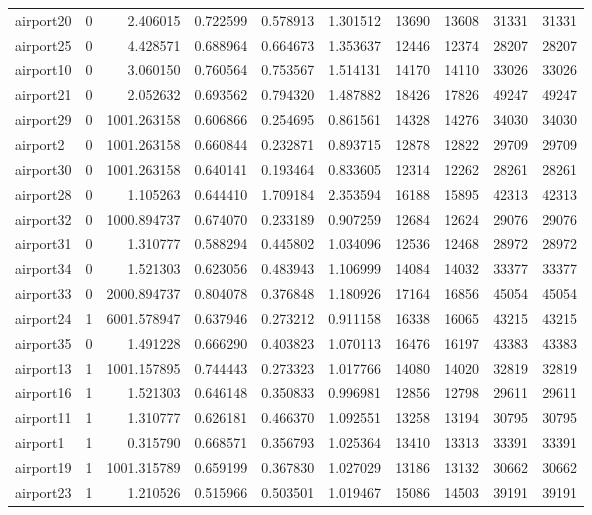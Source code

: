 \begin{longtable}{|l|r|r|r|r|r|r|r|r|r|}
airport20 & 0 & 2.406015 & 0.722599 & 0.578913 & 1.301512 & 13690 & 13608 & 31331 & 31331 \\
airport25 & 0 & 4.428571 & 0.688964 & 0.664673 & 1.353637 & 12446 & 12374 & 28207 & 28207 \\
airport10 & 0 & 3.060150 & 0.760564 & 0.753567 & 1.514131 & 14170 & 14110 & 33026 & 33026 \\
airport21 & 0 & 2.052632 & 0.693562 & 0.794320 & 1.487882 & 18426 & 17826 & 49247 & 49247 \\
airport29 & 0 & 1001.263158 & 0.606866 & 0.254695 & 0.861561 & 14328 & 14276 & 34030 & 34030 \\
airport2 & 0 & 1001.263158 & 0.660844 & 0.232871 & 0.893715 & 12878 & 12822 & 29709 & 29709 \\
airport30 & 0 & 1001.263158 & 0.640141 & 0.193464 & 0.833605 & 12314 & 12262 & 28261 & 28261 \\
airport28 & 0 & 1.105263 & 0.644410 & 1.709184 & 2.353594 & 16188 & 15895 & 42313 & 42313 \\
airport32 & 0 & 1000.894737 & 0.674070 & 0.233189 & 0.907259 & 12684 & 12624 & 29076 & 29076 \\
airport31 & 0 & 1.310777 & 0.588294 & 0.445802 & 1.034096 & 12536 & 12468 & 28972 & 28972 \\
airport34 & 0 & 1.521303 & 0.623056 & 0.483943 & 1.106999 & 14084 & 14032 & 33377 & 33377 \\
airport33 & 0 & 2000.894737 & 0.804078 & 0.376848 & 1.180926 & 17164 & 16856 & 45054 & 45054 \\
airport24 & 1 & 6001.578947 & 0.637946 & 0.273212 & 0.911158 & 16338 & 16065 & 43215 & 43215 \\
airport35 & 0 & 1.491228 & 0.666290 & 0.403823 & 1.070113 & 16476 & 16197 & 43383 & 43383 \\
airport13 & 1 & 1001.157895 & 0.744443 & 0.273323 & 1.017766 & 14080 & 14020 & 32819 & 32819 \\
airport16 & 1 & 1.521303 & 0.646148 & 0.350833 & 0.996981 & 12856 & 12798 & 29611 & 29611 \\
airport11 & 1 & 1.310777 & 0.626181 & 0.466370 & 1.092551 & 13258 & 13194 & 30795 & 30795 \\
airport1 & 1 & 0.315790 & 0.668571 & 0.356793 & 1.025364 & 13410 & 13313 & 33391 & 33391 \\
airport19 & 1 & 1001.315789 & 0.659199 & 0.367830 & 1.027029 & 13186 & 13132 & 30662 & 30662 \\
airport23 & 1 & 1.210526 & 0.515966 & 0.503501 & 1.019467 & 15086 & 14503 & 39191 & 39191 \\

\end{longtable}
